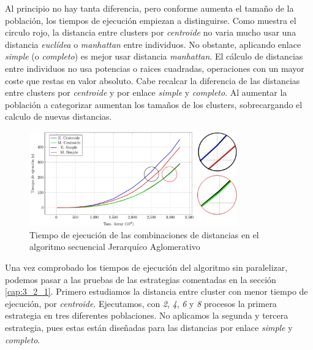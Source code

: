 		Al principio no hay tanta diferencia, pero conforme aumenta el tamaño de la población, los tiempos de ejecución empiezan a distinguirse. Como muestra el circulo rojo, la distancia entre clusters por \textit{centroide} no varia mucho usar una distancia \textit{euclídea} o \textit{manhattan} entre individuos. No obstante, aplicando enlace \textit{simple} (o \textit{completo}) es mejor usar distancia \textit{manhattan}. El cálculo de distancias entre individuos no usa potencias o raices cuadradas, operaciones con un mayor coste que restas en valor absoluto. Cabe recalcar la diferencia de las distancias entre clusters por \textit{centroide} y por enlace \textit{simple} y \textit{completo}. Al aumentar la población a categorizar aumentan los tamaños de los clusters, sobrecargando el calculo de nuevas distancias.
		
		
		\begin{figure}[!h]
			\centering
			\includegraphics[width=0.8\textwidth]{images/chapter_4/jerarquico}
			\caption{Tiempo de ejecución de las combinaciones de distancias en el algoritmo secuencial Jerarquíco Aglomerativo}
			\label{fig:prueba_jerarquicosec}
		\end{figure}
	
			
			
		
		
		Una vez comprobado los tiempos de ejecución del algoritmo sin paralelizar, podemos pasar a las pruebas de las estrategias comentadas en la sección \ref{cap:3_2_1}. Primero estudiamos la distancia entre cluster con menor tiempo de ejecución, por \textit{centroide}. Ejecutamos, con \textit{2}, \textit{4}, \textit{6} y \textit{8} procesos la primera estrategia en tres diferentes poblaciones. No aplicamos la segunda y tercera estrategia, pues estas están diseñadas para las distancias por enlace \textit{simple} y \textit{completo}.
		
